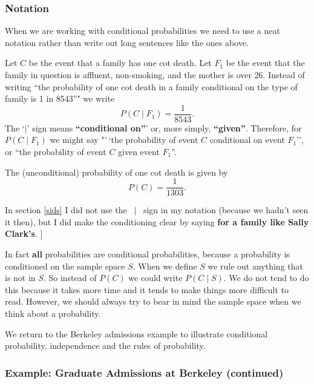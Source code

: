 \documentclass[
  11pt,
  british,
  openany, a4paper]{book}
\begin{document}
\hypertarget{notation}{%
\subsubsection*{Notation}\label{notation}}

When we are working with conditional probabilities we need to use a neat notation rather than write out long sentences like the ones above.

Let \(C\) be the event that a family has one cot death. Let \(F_1\) be the event that the family in question is affluent, non-smoking, and the mother is over 26. Instead of writing ``the probability of one cot death in a family conditional on the type of family is 1 in 8543''" we write
\[P(C \mid F_1) = \frac{1}{8543}.\]
The `\(\mid\)' sign means \textbf{``conditional on''}' or, more simply, \textbf{``given''}. Therefore, for \(P(C \mid F_1)\) we might say "``the probability of event \(C\) conditional on event \(F_1\)'', or ``the probability of event \(C\) given event \(F_1\)''.

The (unconditional) probability of one cot death is given by
\[P(C) = \frac{1}{1303}.\]

In section \ref{sids} I did not use the \(~\mid~\) sign in my notation (because we hadn't seen it then), but I did make the conditioning clear by saying \textbf{for a family like Sally Clark's}. {]}

In fact \textbf{all} probabilities are conditional probabilities, because a probability is conditioned on the sample space \(S\). When we define \(S\) we rule out anything that is not in \(S\). So instead of \(P(C)\) we could write \(P(C \mid S)\). We do not tend to do this because it takes more time and it tends to make things more difficult to read. However, we should always try to bear in mind the sample space when we think about a probability.

We return to the Berkeley admissions example to illustrate conditional probability, independence and the rules of probability.

\hypertarget{example-graduate-admissions-at-berkeley-continued}{%
\subsubsection*{Example: Graduate Admissions at Berkeley (continued)}\label{example-graduate-admissions-at-berkeley-continued}}
\end{document}
